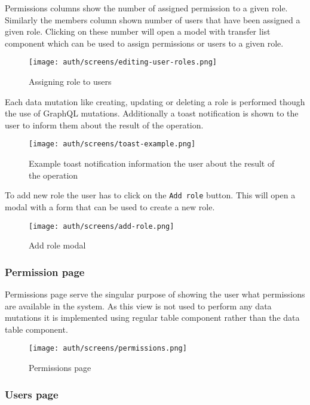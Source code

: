 \documentclass[../main.tex]{subfiles}
\begin{document}
Permissions columns show the number of assigned permission to a given role.
Similarly the members column shown number of users that have been assigned a given role.
Clicking on these number will open a model with transfer list component which can be used to assign permissions or users to a given role.

\begin{figure}[H]
  \centering
  \texttt{[image: auth/screens/editing-user-roles.png]}
  \caption{Assigning role to users}
\end{figure}

Each data mutation like creating, updating or deleting a role is performed though the use of GraphQL mutations.
Additionally a toast notification is shown to the user to inform them about the result of the operation.

\begin{figure}[H]
  \centering
  \texttt{[image: auth/screens/toast-example.png]}
  \caption{Example toast notification information the user about the result of the operation}
\end{figure}

To add new role the user has to click on the \texttt{Add role} button. This will open a modal with a form that can be used to create a new role.

\begin{figure}[H]
  \centering
  \texttt{[image: auth/screens/add-role.png]}
  \caption{Add role modal}
\end{figure}

\subsubsection{Permission page}

Permissions page serve the singular purpose of showing the user what permissions are available in the system.
As this view is not used to perform any data mutations it is implemented using regular table component rather than the data table component.

\begin{figure}[H]
  \centering
  \texttt{[image: auth/screens/permissions.png]}
  \caption{Permissions page}
\end{figure}

\subsubsection{Users page}
\end{document}
